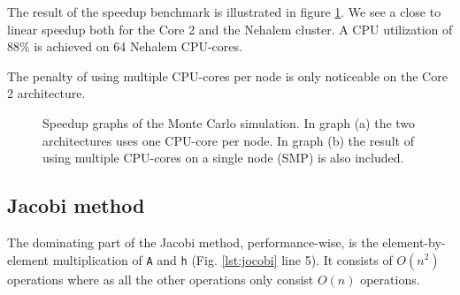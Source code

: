 \documentclass[10pt]{article}
\begin{document}
The result of the speedup benchmark is illustrated in figure \ref{fig:MonteCarlo}. We see a close to linear speedup both for the Core 2 and the Nehalem cluster. A CPU utilization of 88\% is achieved on 64 Nehalem CPU-cores.\begin{tiny}\end{tiny} The penalty of using multiple CPU-cores per node is only noticeable on the Core 2 architecture.



\begin{figure}%
  \begin{center}%
    \caption{Speedup graphs of the Monte Carlo simulation. In graph (a) the two architectures uses one CPU-core per node. In graph (b) the result of using multiple CPU-cores on a single node (SMP) is also included.}%
    \label{fig:MonteCarlo}%
  \end{center}
\end{figure}


\subsection{Jacobi method}
The dominating part of the Jacobi method, performance-wise, is the element-by-element multiplication of \texttt{A} and \texttt{h} (Fig. \ref{lst:jocobi} line 5). It consists of $O(n^2)$ operations where as all the other operations only consist $O(n)$ operations. 

\end{document}
